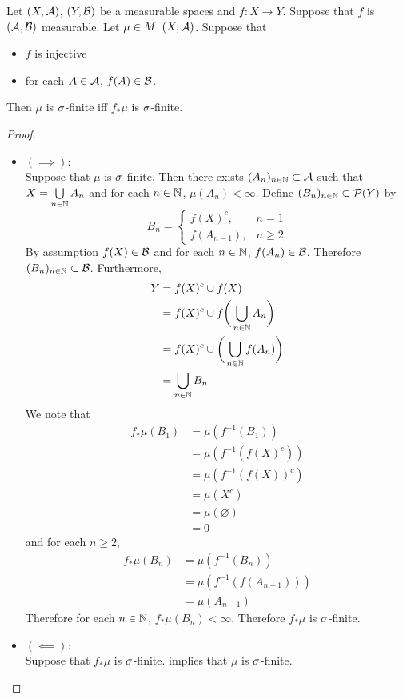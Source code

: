 \documentclass{book}
\begin{document}
\begin{ex} 
	Let $(X, \mathcal{A})$, $(Y, \mathcal{B})$ be a measurable spaces and $f: X \rightarrow Y$. Suppose that $f$ is $(\mathcal{A}, \mathcal{B})$ measurable. Let $\mu \in M_+(X, \mathcal{A})$. Suppose that 
	\begin{itemize}
		\item $f$ is injective
		\item for each $A \in \mathcal{A}$, $f(A) \in \mathcal{B}$.
	\end{itemize} 
	Then $\mu$ is $\sigma$-finite iff $f_*\mu$ is $\sigma$-finite.
\end{ex}

\begin{proof}\
	\begin{itemize}
		\item $(\implies):$ \\
		Suppose that $\mu$ is $\sigma$-finite. Then there exists $(A_n)_{n \in \mathbb{N}} \subset \mathcal{A}$ such that $X = \bigcup\limits_{n \in \mathbb{N}} A_n$ and for each $n \in \mathbb{N}$, $\mu(A_n) < \infty$. Define $(B_n)_{n \in \mathbb{N}} \subset \mathcal{P}(Y)$ by 
		\[
		B_n = 
		\begin{cases}
			f(X)^c, & n = 1 \\
			f(A_{n-1}), & n \geq 2
		\end{cases}\]
		By assumption $f(X) \in \mathcal{B}$ and for each $n \in \mathbb{N}$, $f(A_n) \in \mathcal{B}$. Therefore $(B_n)_{n \in \mathbb{N}} \subset \mathcal{B}$. Furthermore, 
		\begin{align*}
			Y
			& = f(X)^c \cup f(X) \\
			& =  f(X)^c \cup f\bigg( \bigcup_{n \in \mathbb{N}} A_n \bigg) \\
			& =  f(X)^c \cup \bigg( \bigcup_{n \in \mathbb{N}} f(A_n) \bigg) \\
			& =  \bigcup_{n \in \mathbb{N}} B_n \\
		\end{align*}
		We note that 
		\begin{align*}
			f_*\mu(B_1)
			& = \mu(f^{-1}(B_1)) \\
			& = \mu(f^{-1} (f(X)^c)) \\
			& = \mu(f^{-1}(f(X))^c) \\
			& = \mu(X^c) \\
			& = \mu(\varnothing) \\
			& = 0
		\end{align*}
		and for each $n \geq 2$, 
		\begin{align*}
			f_*\mu(B_n) 
			& = \mu(f^{-1}(B_n)) \\
			& = \mu(f^{-1}(f(A_{n-1}))) \\ 
			& = \mu(A_{n-1})
		\end{align*}
		Therefore for each $n \in \mathbb{N}$, $f_* \mu(B_n) < \infty$. Therefore $f_*\mu$ is $\sigma$-finite.
		\item $(\impliedby):$ \\
		Suppose that $f_*\mu$ is $\sigma$-finite.  implies that $\mu$ is $\sigma$-finite.
	\end{itemize}
\end{proof}
\end{document}
